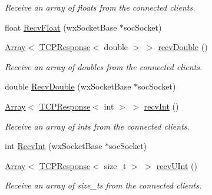 \begin{DoxyCompactItemize}
\begin{DoxyCompactList}\small\item\em Receive an array of floats from the connected clients. \end{DoxyCompactList}\item 
float \mbox{\hyperlink{class_rad_j_a_v_1_1_networking_1_1wx_widgets_t_c_p_server_a9296263dca17a376711a36753965dd51}{Recv\+Float}} (wx\+Socket\+Base $\ast$soc\+Socket)
\item 
\mbox{\hyperlink{class_rad_j_a_v_1_1_array}{Array}}$<$ \mbox{\hyperlink{class_rad_j_a_v_1_1_networking_1_1_t_c_p_response}{T\+C\+P\+Response}}$<$ double $>$ $>$ \mbox{\hyperlink{class_rad_j_a_v_1_1_networking_1_1wx_widgets_t_c_p_server_ae2e774ab7ab334a0eea09ece7f7f2775}{recv\+Double}} ()
\begin{DoxyCompactList}\small\item\em Receive an array of doubles from the connected clients. \end{DoxyCompactList}\item 
double \mbox{\hyperlink{class_rad_j_a_v_1_1_networking_1_1wx_widgets_t_c_p_server_a174193c32b2d90a5b25fd1d44be7e3ac}{Recv\+Double}} (wx\+Socket\+Base $\ast$soc\+Socket)
\item 
\mbox{\hyperlink{class_rad_j_a_v_1_1_array}{Array}}$<$ \mbox{\hyperlink{class_rad_j_a_v_1_1_networking_1_1_t_c_p_response}{T\+C\+P\+Response}}$<$ int $>$ $>$ \mbox{\hyperlink{class_rad_j_a_v_1_1_networking_1_1wx_widgets_t_c_p_server_a59f79fdace93a01d4c6b062a0e88077d}{recv\+Int}} ()
\begin{DoxyCompactList}\small\item\em Receive an array of ints from the connected clients. \end{DoxyCompactList}\item 
int \mbox{\hyperlink{class_rad_j_a_v_1_1_networking_1_1wx_widgets_t_c_p_server_a6b95b5c066ae471279a2d47cee0a08c9}{Recv\+Int}} (wx\+Socket\+Base $\ast$soc\+Socket)
\item 
\mbox{\hyperlink{class_rad_j_a_v_1_1_array}{Array}}$<$ \mbox{\hyperlink{class_rad_j_a_v_1_1_networking_1_1_t_c_p_response}{T\+C\+P\+Response}}$<$ size\+\_\+t $>$ $>$ \mbox{\hyperlink{class_rad_j_a_v_1_1_networking_1_1wx_widgets_t_c_p_server_a129c677e9e61fc1ce3fe09d42306d27d}{recv\+U\+Int}} ()
\begin{DoxyCompactList}\small\item\em Receive an array of size\+\_\+ts from the connected clients. \end{DoxyCompactList}\item 

\end{DoxyCompactItemize}
